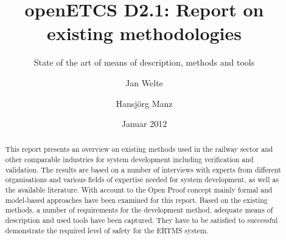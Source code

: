 \documentclass{./template/openetcs_report}
\begin{document}
\frontmatter
{}




\title{openETCS D2.1: Report on existing methodologies}

\subtitle{State of the art of means of description, methods and tools}

\date{Januar 2012}

\author{Jan Welte \and Hansj\"org Manz}





\begin{abstract}
	This report presents an overview on existing methods used in the railway sector and other comparable industries for system development including verification and validation. The results are based on a number of interviews with experts from different organisations and various fields of expertise needed for system development, as well as the available literature. With account to the Open Proof concept mainly formal and model-based approaches have been examined for this report. Based on the existing methods, a number of requirements for the development method, adequate means of description and used tools have been captured. They have to be satisfied to successful demonstrate the required level of safety for the ERTMS system.
\end{abstract}

\maketitle
\tableofcontents
\listoffiguresandtables
\end{document}
